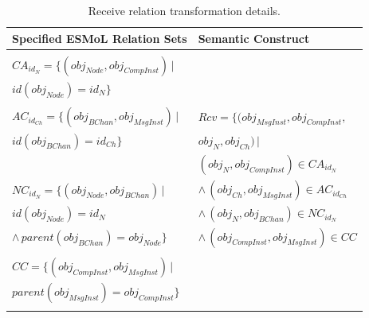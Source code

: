 \begin{table}
\centering

\begin{tabular}[width=0.5\columnwidth]{ | l | l | }
 \hline
 \textbf{Specified ESMoL Relation Sets} & \textbf{Semantic
Construct} \\
 \hline \hline
                                                                        & \\
 $CA_{id_N} = \{ (obj_{Node}, obj_{CompInst} ) \, |$                    & \\
 \hspace{1.7cm} $ id(obj_{Node}) = id_N \} $                            & \\
                                                                        & \\
 $AC_{id_{Ch}} = \{ (obj_{BChan}, obj_{MsgInst} ) \, |$          
   & 
$ Rcv = \{(obj_{MsgInst}, obj_{CompInst}, $  \\
 \hspace{1.6cm} $id(obj_{BChan}) = id_{Ch} \} $                         & 
\hspace{1.3cm} $obj_{N}, obj_{Ch}) \, |$ \\
                                                                        &  
\hspace{0.8cm} $(obj_{N}, obj_{CompInst}) \in CA_{id_N}$ \\
 $NC_{id_N} = \{ (obj_{Node}, obj_{BChan}) \, | $                       & 
\hspace{0.5cm} $ \wedge \, (obj_{Ch}, obj_{MsgInst}) \in AC_{id_{Ch}}$ \\
 \hspace{1.35cm} $id(obj_{Node}) = id_N $                               &
\hspace{0.5cm} $ \wedge \, (obj_{N}, obj_{BChan}) \in NC_{id_N}$ \\ 
 \hspace{1cm} $ \wedge \, parent(obj_{BChan} ) = obj_{Node} \}$         &
\hspace{0.5cm} $ \wedge \, (obj_{CompInst}, obj_{MsgInst}) \in CC $ \\
                                                                        & \\
 $CC = \{ (obj_{CompInst}, obj_{MsgInst} ) \, | $                       & \\
 \hspace{0.7cm} $parent(obj_{MsgInst} ) = obj_{CompInst} \}$            & \\ 
                                                                        & \\
 \hline
\end{tabular}
	\caption{Receive relation transformation details.}
	\label{tab:receive}
\end{table}

